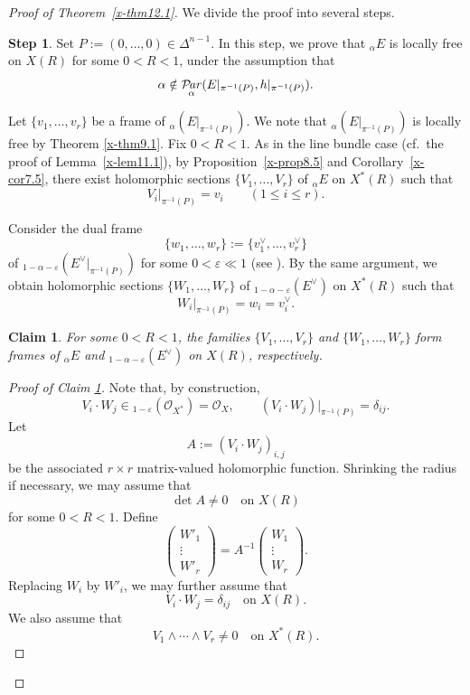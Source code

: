 \documentclass[12pt,twoside]{amsart}
\DeclareMathOperator{\Par}{\mathcal{P}\!\it{ar}}
\newtheorem{claim}[thm]{Claim}
\theoremstyle{definition}
\newtheorem{step}{Step}
\begin{document}
\begin{proof}[Proof of Theorem~\ref{x-thm12.1}]
We divide the proof into several steps.

\setcounter{step}{0}
\begin{step}\label{x-step12.1.1}
Set $P:=(0,\ldots,0)\in \Delta^{n-1}$.
In this step, we prove that ${}_\alpha E$ is locally free on $X(R)$ for some
$0<R<1$, under the assumption that
\[
\alpha \notin
\Par_\alpha(E|_{\pi^{-1}(P)},h|_{\pi^{-1}(P)}).
\]

Let $\{v_1,\ldots,v_r\}$ be a frame of
${}_\alpha(E|_{\pi^{-1}(P)})$. 
We note that ${}_\alpha (E|_{\pi^{-1}(P)})$ is locally 
free by Theorem \ref{x-thm9.1}. 
Fix $0<R<1$.
As in the line bundle case (cf.\ the proof of Lemma~\ref{x-lem11.1}),
by Proposition~\ref{x-prop8.5} and Corollary~\ref{x-cor7.5}, there exist
holomorphic sections $\{V_1,\ldots,V_r\}$ of ${}_\alpha E$ on $X^*(R)$ such
that
\[
V_i|_{\pi^{-1}(P)}=v_i \qquad (1\le i\le r).
\]

Consider the dual frame
\[
\{w_1,\ldots,w_r\}:=\{v_1^\vee,\ldots,v_r^\vee\}
\]
of ${}_{1-\alpha-\varepsilon}(E^\vee|_{\pi^{-1}(P)})$ for some
$0<\varepsilon\ll1$ (see \cite[Theorem~1.12]{fujino-fujisawa-ono}).
By the same argument, we obtain holomorphic sections
$\{W_1,\ldots,W_r\}$ of ${}_{1-\alpha-\varepsilon}(E^\vee)$ on $X^*(R)$ such
that
\[
W_i|_{\pi^{-1}(P)}=w_i=v_i^\vee .
\]

\begin{claim}\label{x-claim12.2}
For some $0<R<1$, the families $\{V_1,\ldots,V_r\}$ and
$\{W_1,\ldots,W_r\}$ form frames of ${}_\alpha E$ and
${}_{1-\alpha-\varepsilon}(E^\vee)$ on $X(R)$, respectively.
\end{claim}

\begin{proof}[Proof of Claim \ref{x-claim12.2}]
Note that, by construction,
\[
V_i \cdot W_j \in {}_{1-\varepsilon}\left(\mathcal O_{X^*}\right)
= \mathcal O_X,
\qquad
(V_i \cdot W_j)\big|_{\pi^{-1}(P)} = \delta_{ij}.
\]
Let
\[
A := (V_i \cdot W_j)_{i,j}
\]
be the associated $r\times r$ matrix-valued holomorphic function.
Shrinking the radius if necessary, we may assume that
\[
\det A \neq 0 \quad \text{on } X(R)
\]
for some $0<R<1$.
Define
\[
\begin{pmatrix}
W'_1 \\ \vdots \\ W'_r
\end{pmatrix}
=
A^{-1}
\begin{pmatrix}
W_1 \\ \vdots \\ W_r
\end{pmatrix}.
\]
Replacing $W_i$ by $W'_i$, we may further assume that
\[
V_i \cdot W_j = \delta_{ij}
\quad \text{on } X(R).
\]
We also assume that
\[
V_1 \wedge \cdots \wedge V_r \neq 0
\quad \text{on } X^*(R).
\]


\end{proof}
\end{step}
\end{proof}
\end{document}
